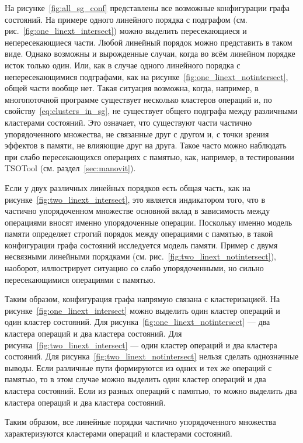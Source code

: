 На рисунке~\ref{fig:all_sg_conf} представлены все возможные
конфигурации графа состояний. На примере одного линейного порядка с
подграфом (см. рис.~\ref{fig:one_linext_intersect}) можно выделить
пересекающиеся и непересекающиеся части.
Любой линейный порядок можно представить в таком виде.
Однако возможны и вырожденные случаи, когда во всём линейном порядке
исток только один.
Или, как в случае одного линейного порядка с непересекающимися
подграфами, как на рисунке~\ref{fig:one_linext_notintersect}, общей
части вообще нет.
Такая ситуация возможна, когда, например, в многопоточной программе
существует несколько кластеров операций и, по
свойству~\ref{eq:clusters_in_sg}, не существует общего подграфа между
различными кластерами состояний. Это означает, что существуют части
частично упорядоченного множества, не связанные друг с другом и, с
точки зрения эффектов в памяти, не влияющие друг на друга. Такое
часто можно наблюдать при слабо пересекающихся операциях с памятью,
как, например, в тестировании TSOTool (см. раздел~\ref{sec:manovit}).

Если у двух различных линейных порядков есть общая
часть, как на рисунке~\ref{fig:two_linext_intersect}, это является
индикатором того,
что в частично упорядоченном множестве основной вклад в зависимость
между операциями вносят именно упорядоченные операции. Поскольку
именно модель памяти определяет строгий порядок между операциями с
памятью, в такой конфигурации графа состояний исследуется модель памяти.
Пример с двумя несвязными линейными
порядками (см. рис.~\ref{fig:two_linext_notintersect}), наоборот, иллюстрирует
ситуацию со слабо упорядоченными, но сильно пересекающимися
операциями с памятью.

Таким образом, конфигурация графа напрямую связана с кластеризацией.
На рисунке~\ref{fig:one_linext_intersect} можно выделить один кластер
операций и один кластер состояний. Для
рисунка~\ref{fig:one_linext_notintersect} — два кластера операций и
два кластера состояний. Для рисунка~\ref{fig:two_linext_intersect} —
один кластер операций и два кластера состояний. Для
рисунка~\ref{fig:two_linext_notintersect} нельзя сделать однозначные
выводы. Если различные пути формируются из одних и тех же операций с
памятью, то в этом случае можно выделить один кластер операций и два
кластера состояний. Если из разных операций с памятью, то можно
выделить два кластера операций и два кластера состояний.

Таким образом, все линейные порядки частично упорядоченного множества
характеризуются кластерами операций и кластерами состояний.

